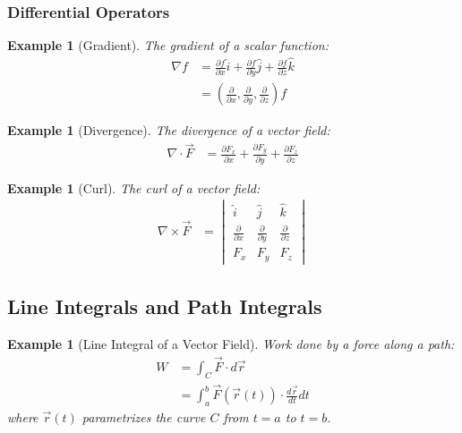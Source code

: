 \documentclass{article}
\newtheorem{example}[theorem]{Example}
\begin{document}
\subsubsection{Differential Operators}
\begin{example}[Gradient]
The gradient of a scalar function:
\begin{align*}
    \nabla f &= \frac{\partial f}{\partial x}\hat{i} + \frac{\partial f}{\partial y}\hat{j} + \frac{\partial f}{\partial z}\hat{k} \\
    &= \left(\frac{\partial}{\partial x}, \frac{\partial}{\partial y}, \frac{\partial}{\partial z}\right)f
\end{align*}
\end{example}

\begin{example}[Divergence]
The divergence of a vector field:
\begin{align*}
    \nabla \cdot \vec{F} &= \frac{\partial F_x}{\partial x} + \frac{\partial F_y}{\partial y} + \frac{\partial F_z}{\partial z}
\end{align*}
\end{example}

\begin{example}[Curl]
The curl of a vector field:
\begin{align*}
    \nabla \times \vec{F} &= \begin{vmatrix}
        \hat{i} & \hat{j} & \hat{k} \\
        \frac{\partial}{\partial x} & \frac{\partial}{\partial y} & \frac{\partial}{\partial z} \\
        F_x & F_y & F_z
    \end{vmatrix}
\end{align*}
\end{example}

\subsection{Line Integrals and Path Integrals}

\begin{example}[Line Integral of a Vector Field]
Work done by a force along a path:
\begin{align*}
    W &= \int_C \vec{F} \cdot d\vec{r} \\
    &= \int_a^b \vec{F}(\vec{r}(t)) \cdot \frac{d\vec{r}}{dt} dt
\end{align*}
where $\vec{r}(t)$ parametrizes the curve $C$ from $t=a$ to $t=b$.
\end{example}
\end{document}
